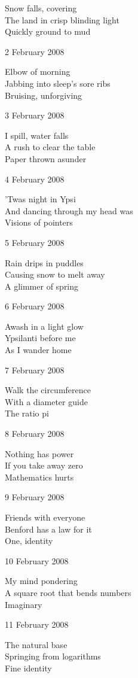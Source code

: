 \documentclass[12pt]{article}
\begin{document}
Snow falls, covering \\
The land in crisp blinding light \\
Quickly ground to mud

\newpage

2 February 2008

Elbow of morning \\
Jabbing into sleep's sore ribs \\
Bruising, unforgiving

3 February 2008

I spill, water falls \\
A rush to clear the table \\
Paper thrown asunder

4 February 2008

'Twas night in Ypsi \\
And dancing through my head was \\
Visions of pointers

5 February 2008

Rain drips in puddles \\
Causing snow to melt away \\
A glimmer of spring

6 February 2008

Awash in a light glow \\
Ypsilanti before me \\
As I wander home

7 February 2008

Walk the circumference \\
With a diameter guide \\
The ratio pi

8 February 2008

Nothing has power \\
If you take away zero \\
Mathematics hurts

\newpage

9 February 2008

Friends with everyone \\
Benford has a law for it \\
One, identity

10 February 2008

My mind pondering \\
A square root that bends numbers \\
Imaginary

11 February 2008

The natural base \\
Springing from logarithms \\
Fine identity
\end{document}
